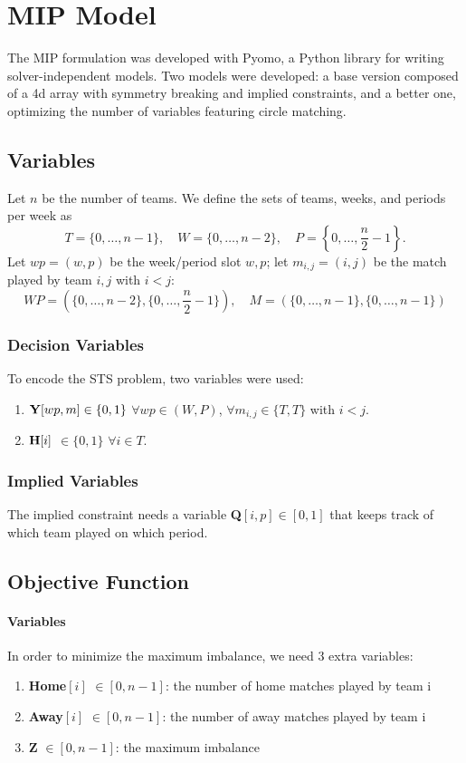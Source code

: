 

\section{MIP Model}
The MIP formulation was developed with Pyomo, a Python library for writing solver-independent models.
Two models were developed: a base version composed of a 4d array with symmetry breaking and implied constraints, and a better one, optimizing the number of variables featuring circle matching.

\subsection{Variables}
Let $n$ be the number of teams. We define the sets of teams, weeks, and periods per week as
\[
T = \{0, \dots, n-1\}, \quad W = \{0, \dots, n-2\}, \quad P = \left\{0, \dots, \frac{n}{2} - 1\right\}.
\]
Let $wp = (w,p)$ be the week/period slot $w,p$;
let $m_{i,j} = (i,j)$ be the match played by team $i,j$ with $i<j$:
\[
WP = (\{0, \dots, n-2\},\{0, \dots, \frac{n}{2} - 1\}), \quad M = (\{0, \dots, n-1\},\{0, \dots, n-1\})
\]

\subsubsection*{Decision Variables}
To encode the STS problem, two variables were used:
\begin{enumerate}
\item $\text{\textbf{Y}}[wp,m] \in \{0,1\}$ \quad $\forall wp \in (W,P)$, $\forall m_{i,j} \in \{T,T\}$ with $i<j$.
\item $\text{\textbf{H}}[i]$ $\in \{0,1\}$ \quad $\forall i \in T$. \\ 
\end{enumerate}
\subsubsection*{Implied Variables}
The implied constraint needs a variable \textbf{Q}$[i,p] \in [0,1]$ that keeps track of which team played on which period.

\subsection{Objective Function}
\paragraph{Variables}
In order to minimize the maximum imbalance, we need 3 extra variables:
\begin{enumerate}
\item \textbf{Home}$[i]$ $\in [0,n-1]$: the number of home matches played by team i
\item \textbf{Away}$[i]$ $\in [0,n-1]$: the number of away matches played by team i
\item \textbf{Z} $ \in [0,n-1]$: the maximum imbalance
\end{enumerate}

